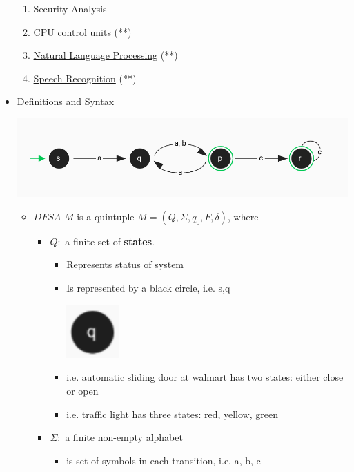 \documentclass[12pt]{article}
\begin{document}
\begin{itemize}
\begin{enumerate}[1.]
        \item Security Analysis
        \item \underline{CPU control units} (**)
        \item \underline{Natural Language Processing} (**)
        \item \underline{Speech Recognition}  (**)
    \end{enumerate}

    \item Definitions and Syntax
    \begin{center}
    \includegraphics[width=\linewidth]{images/worksheet_8_notes_6.png}
    \end{center}
    \begin{itemize}
        \item $DFSA$ $M$ is a quintuple $M = (Q,\Sigma, q_0, F, \delta)$, where
        \begin{itemize}
            \item $Q:$ a finite set of \textbf{states}.
            \begin{itemize}
                \item Represents status of system
                \item Is represented by a black circle, i.e. s,q

                \begin{center}
                \includegraphics[width=2cm]{images/worksheet_8_notes_8.png}
                \end{center}

                \item i.e. automatic sliding door at walmart has two states: either close or open
                \item i.e. traffic light has three states: red, yellow, green
            \end{itemize}
            \item $\Sigma:$ a finite non-empty alphabet
            \begin{itemize}
                \item is set of symbols in each transition, i.e. a, b, c


\end{itemize}
\end{itemize}
\end{itemize}
\end{itemize}
\end{document}
